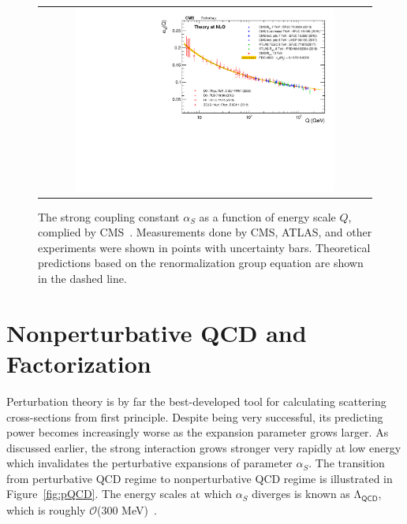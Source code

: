 \begin{figure}[tbh!]
 \begin{center}
 \begin{tabular}{c}
 \includegraphics[width=0.8\textwidth]{figures/Part1/QCD/alphaS}
 \end{tabular}
 \caption{The strong coupling constant $\alpha_{S}$ as a function of energy scale $Q$, complied by \ac{CMS}~\cite{cms:twiki}. Measurements done by \ac{CMS}, \ac{ATLAS}, and other experiments were shown in points with uncertainty bars. Theoretical predictions based on the renormalization group equation are shown in the dashed line.}
 \label{fig:alphaS}
 \end{center}
\end{figure}

\section{Nonperturbative QCD and Factorization}
\label{sec:npQCD}

Perturbation theory is by far the best-developed tool for calculating scattering cross-sections from first principle. Despite being very successful, its predicting power becomes increasingly worse as the expansion parameter grows larger. As discussed earlier, the strong interaction grows stronger very rapidly at low energy which invalidates the perturbative expansions of parameter $\alpha_{S}$. The transition from perturbative \ac{QCD} regime to nonperturbative \ac{QCD} regime is illustrated in Figure~\ref{fig:pQCD}. The energy scales at which $\alpha_{S}$ diverges is known as $\mathrm{\Lambda}_{\textsf{QCD}}$, which is roughly $\mathcal{O}$(300 MeV)~\cite{Deur:2016tte}.

